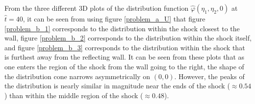 \documentclass[a4paper]{article}
\begin{document}
From the three different 3D plots of the distribution function $\hat{\varphi}(\eta_1, \eta_2, 0)$ at $\hat{t} = 40$, it can be seen from using figure \ref{problem_a_U} that figure \ref{problem_b_1} corresponds to the distribution within the shock closest to the wall, figure \ref{problem_b_2} corresponds to the distribution within the shock itself, and figure \ref{problem_b_3} corresponds to the distribution within the shock that is furthest away from the reflecting wall. It can be seen from these plots that as one enters the region of the shock from the wall going to the right, the shape of the distribution cone narrows asymmetrically on $(0,0)$. However, the peaks of the distribution is nearly similar in magnitude near the ends of the shock ($\approx 0.54$) than within the middle region of the shock ($\approx 0.48$). 

\clearpage
\end{document}
